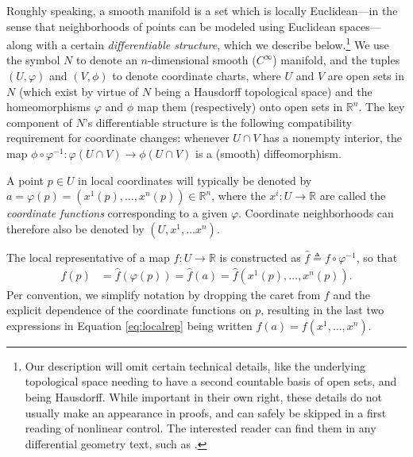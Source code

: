 \documentclass[psamsfonts]{amsart}
\theoremstyle{definition}
\theoremstyle{remark}
\newcommand*\R{\mathds{R}}
\numberwithin{equation}{section}
\begin{document}
Roughly speaking, a smooth manifold is a set which is locally Euclidean---in the sense that neighborhoods of points can be modeled using Euclidean spaces---along with a certain \textit{differentiable structure}, which we describe below.\footnote{Our description will omit certain technical details, like the underlying topological space needing to have a second countable basis of open sets, and being Hausdorff. While important in their own right, these details do not usually make an appearance in proofs, and can safely be skipped in a first reading of nonlinear control. The interested reader can find them in any differential geometry text, such as \cite{abraham_manifolds_1988}.} We use the symbol $N$ to denote an $n$-dimensional smooth ($C^{\infty}$) manifold, and the tuples $(U, \varphi)$ and $(V, \phi)$ to denote coordinate charts, where $U$ and $V$ are open sets in $N$ (which exist by virtue of $N$ being a Hausdorff topological space) and the homeomorphisms $\varphi$ and $\phi$ map them (respectively) onto open sets in $\R^n$. The key component of $N$'s differentiable structure is the following compatibility requirement for coordinate changes: whenever $U \cap V$ has a nonempty interior, the map $\phi\circ\varphi^{-1}: \varphi(U\cap V) \rightarrow \phi(U\cap V)$ is a (smooth) diffeomorphism. %

A point $p\in U$ in local coordinates will typically be denoted by $a = \varphi (p) = (x^1(p), \dots, x^n(p)) \in \R^n$, where the $x^i: U \rightarrow \R$ are called the \textit{coordinate functions} corresponding to a given $\varphi$. Coordinate neighborhoods can therefore also be denoted by $(U, x^1, \dots x^n)$. 

The local representative of a map $f:U\rightarrow \R$ is constructed as $\hat f \triangleq f\circ \varphi^{-1}$, so that 
\begin{align}\label{eq:localrep}
f(p) & = \hat f(\varphi(p)) =\hat f(a) = \hat f(x^1(p), \dots, x^n(p)).
\end{align}
Per convention, we simplify notation by dropping the caret from $f$ and the explicit dependence of the coordinate functions on $p$, resulting in the last two expressions in Equation \ref{eq:localrep} being written $f(a) = f(x^1, \dots, x^n)$. 
\end{document}
